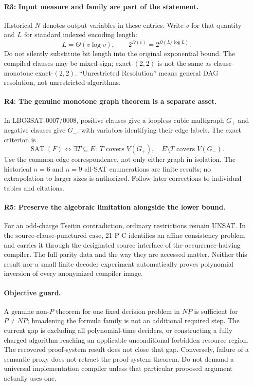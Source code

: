 \documentclass[11pt]{article}
\begin{document}
\paragraph{R3: Input measure and family are part of the statement.}
Historical $N$ denotes output variables in these entries. Write $v$ for that quantity and $L$ for standard indexed encoding length:
\[
 L=\Theta(v\log v),\qquad
 2^{\Omega(v)}=2^{\Omega(L/\log L)}.
\]
Do not silently substitute bit length into the original exponential bound. The compiled clauses may be mixed-sign; exact-$(2,2)$ is not the same as clause-monotone exact-$(2,2)$. ``Unrestricted Resolution'' means general DAG resolution, not unrestricted algorithms.

\paragraph{R4: The genuine monotone graph theorem is a separate asset.}
In LBO3SAT-0007/0008, positive clauses give a loopless cubic multigraph $G_+$ and negative clauses give $G_-$, with variables identifying their edge labels. The exact criterion is
\[
 \operatorname{SAT}(F)\iff
 \exists T\subseteq E:\ T\text{ covers }V(G_+),\quad
 E\setminus T\text{ covers }V(G_-).
\]
Use the common edge correspondence, not only either graph in isolation. The historical $n=6$ and $n=9$ all-SAT enumerations are finite results; no extrapolation to larger sizes is authorized. Follow later corrections to individual tables and citations.

\paragraph{R5: Preserve the algebraic limitation alongside the lower bound.}
For an odd-charge Tseitin contradiction, ordinary restrictions remain UNSAT. In the source-clause-punctured case, 21 P C identifies an affine consistency problem and carries it through the designated source interface of the occurrence-halving compiler. The full parity data and the way they are accessed matter. Neither this result nor a small finite decoder experiment automatically proves polynomial inversion of every anonymized compiler image.

\paragraph{Objective guard.}
A genuine non-$P$ theorem for one fixed decision problem in $NP$ is sufficient for $P\ne NP$; broadening the formula family is not an additional required step. The current gap is excluding all polynomial-time deciders, or constructing a fully charged algorithm reaching an applicable unconditional forbidden resource region. The recovered proof-system result does not close that gap. Conversely, failure of a semantic proxy does not retract the proof-system theorem. Do not demand a universal implementation compiler unless that particular proposed argument actually uses one.
\end{document}
